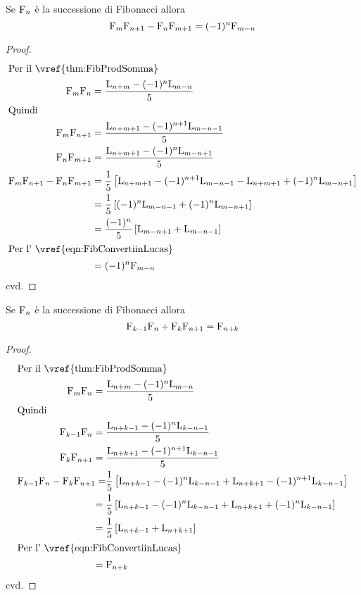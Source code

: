 \begin{thm}\label{thm:FibdOcagne}
	Se $\mathrm{F}_{n}$ è la successione di Fibonacci allora 
	\begin{equation}
		\mathrm{F}_{m}\mathrm{F}_{n+1}-\mathrm{F}_{n}\mathrm{F}_{m+1}=(-1)^n\mathrm{F}_{m-n}
	\end{equation}\label{eqn:FibdOcagne}
\end{thm}
\begin{proof}
\begin{align*}
	\intertext{Per il~\vref{thm:FibProdSomma}}
	\Fib{m}\Fib{n}={}&\dfrac{\Luc{n+m}-(-1)^n\Luc{m-n}}{5}\\
	\intertext{Quindi}
		\Fib{m}\Fib{n+1}={}&\dfrac{\Luc{n+m+1}-(-1)^{n+1}\Luc{m-n-1}}{5}\\
		\Fib{n}\Fib{m+1}={}&\dfrac{\Luc{n+m+1}-(-1)^{n}\Luc{m-n+1}}{5}\\
		\Fib{m}\Fib{n+1}-\Fib{n}\Fib{m+1}
	={}&\dfrac{1}{5}\left[\Luc{n+m+1}-(-1)^{n+1}\Luc{m-n-1}-\Luc{n+m+1}+(-1)^{n}\Luc{m-n+1}\right]\\
={}&\dfrac{1}{5}\left[(-1)^{n}\Luc{m-n-1}+(-1)^{n}\Luc{m-n+1}\right]\\
={}&\dfrac{(-1)^{n}}{5}\left[\Luc{m-n+1}+\Luc{m-n-1}\right]\\
\intertext{Per l'~\vref{eqn:FibConvertiinLucas}}
={}&(-1)^{n}\Fib{m-n}\\
\end{align*}
cvd.
\end{proof}
\begin{thm}\label{thm:FibHonsberger}
	Se $\mathrm{F}_{n}$ è la successione di Fibonacci allora 
	\begin{equation}
		\mathrm{F}_{k-1}\mathrm{F}_{n}+\mathrm{F}_{k}\mathrm{F}_{n+1}=\mathrm{F}_{n+k}
	\end{equation}\label{eqn:FibHonsberger}
\end{thm}
\begin{proof}
	\begin{align*}
		\intertext{Per il~\vref{thm:FibProdSomma}}
	\Fib{m}\Fib{n}={}&\dfrac{\Luc{n+m}-(-1)^n\Luc{m-n}}{5}\\
	\intertext{Quindi}
	\Fib{k-1}\Fib{n}={}&\dfrac{\Luc{n+k-1}-(-1)^n\Luc{k-n-1}}{5}\\
	\Fib{k}\Fib{n+1}={}&\dfrac{\Luc{n+k+1}-(-1)^{n+1}\Luc{k-n-1}}{5}\\
	\Fib{k-1}\Fib{n}-\Fib{k}\Fib{n+1}=
	&\dfrac{1}{5}\left[\Luc{n+k-1}-(-1)^n\Luc{k-n-1}+\Luc{n+k+1}-(-1)^{n+1}\Luc{k-n-1}\right]\\
={}&\dfrac{1}{5}\left[\Luc{n+k-1}-(-1)^n\Luc{k-n-1}+\Luc{n+k+1}+(-1)^{n}\Luc{k-n-1}\right]\\
={}&\dfrac{1}{5}\left[\Luc{n+k-1}+\Luc{n+k+1}\right]\\
	\intertext{Per l'~\vref{eqn:FibConvertiinLucas}}
={}&\Fib{n+k}
	\end{align*}
cvd.
\end{proof}
